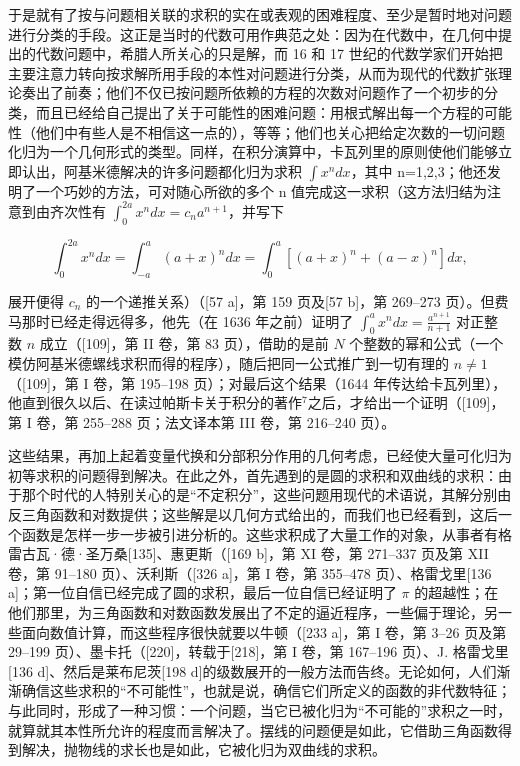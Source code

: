 于是就有了按与问题相关联的求积的实在或表观的困难程度、至少是暂时地对问题进行分类的手段。这正是当时的代数可用作典范之处：因为在代数中，在几何中提出的代数问题中，希腊人所关心的只是解，而 16 和 17 世纪的代数学家们开始把主要注意力转向按求解所用手段的本性对问题进行分类，从而为现代的代数扩张理论奏出了前奏；他们不仅已按问题所依赖的方程的次数对问题作了一个初步的分类，而且已经给自己提出了关于可能性的困难问题：用根式解出每一个方程的可能性（他们中有些人是不相信这一点的），等等；他们也关心把给定次数的一切问题化归为一个几何形式的类型。同样，在积分演算中，卡瓦列里的原则使他们能够立即认出，阿基米德解决的许多问题都化归为求积 \(\int x^{n}dx\)，其中 n=1,2,3；他还发明了一个巧妙的方法，可对随心所欲的多个 n 值完成这一求积（这方法归结为注意到由齐次性有 \(\int_{0}^{2a}x^{n}dx=c_{n}a^{n+1}\)，并写下

\[
\int_ {0} ^ {2 a} x ^ {n} d x = \int_ {- a} ^ {a} (a + x) ^ {n} d x = \int_ {0} ^ {a} [ (a + x) ^ {n} + (a - x) ^ {n} ] d x,
\]

展开便得 \(c_n\) 的一个递推关系）（{[}57 a{]}，第 159 页及{[}57 b{]}，第 269–273 页）。但费马那时已经走得远得多，他先（在 1636 年之前）证明了 \(\int_0^a x^n dx = \frac{a^{n+1}}{n+1}\) 对正整数 \(n\) 成立（{[}109{]}，第 II 卷，第 83 页），借助的是前 \(N\) 个整数的幂和公式（一个模仿阿基米德螺线求积而得的程序），随后把同一公式推广到一切有理的 \(n \neq 1\)（{[}109{]}，第 I 卷，第 195–198 页）；对最后这个结果（1644 年传达给卡瓦列里），他直到很久以后、在读过帕斯卡关于积分的著作\(^7\)之后，才给出一个证明（{[}109{]}，第 I 卷，第 255–288 页；法文译本第 III 卷，第 216–240 页）。

这些结果，再加上起着变量代换和分部积分作用的几何考虑，已经使大量可化归为初等求积的问题得到解决。在此之外，首先遇到的是圆的求积和双曲线的求积：由于那个时代的人特别关心的是“不定积分”，这些问题用现代的术语说，其解分别由反三角函数和对数提供；这些解是以几何方式给出的，而我们也已经看到，这后一个函数是怎样一步一步被引进分析的。这些求积成了大量工作的对象，从事者有格雷古瓦·德·圣万桑{[}135{]}、惠更斯（{[}169 b{]}，第 XI 卷，第 271–337 页及第 XII 卷，第 91–180 页）、沃利斯（{[}326 a{]}，第 I 卷，第 355–478 页）、格雷戈里{[}136 a{]}；第一位自信已经完成了圆的求积，最后一位自信已经证明了 \(\pi\) 的超越性；在他们那里，为三角函数和对数函数发展出了不定的逼近程序，一些偏于理论，另一些面向数值计算，而这些程序很快就要以牛顿（{[}233 a{]}，第 I 卷，第 3–26 页及第 29–199 页）、墨卡托（{[}220{]}，转载于{[}218{]}，第 I 卷，第 167–196 页）、J. 格雷戈里{[}136 d{]}、然后是莱布尼茨{[}198 d{]}的级数展开的一般方法而告终。无论如何，人们渐渐确信这些求积的“不可能性”，也就是说，确信它们所定义的函数的非代数特征；与此同时，形成了一种习惯：一个问题，当它已被化归为“不可能的”求积之一时，就算就其本性所允许的程度而言解决了。摆线的问题便是如此，它借助三角函数得到解决，抛物线的求长也是如此，它被化归为双曲线的求积。

